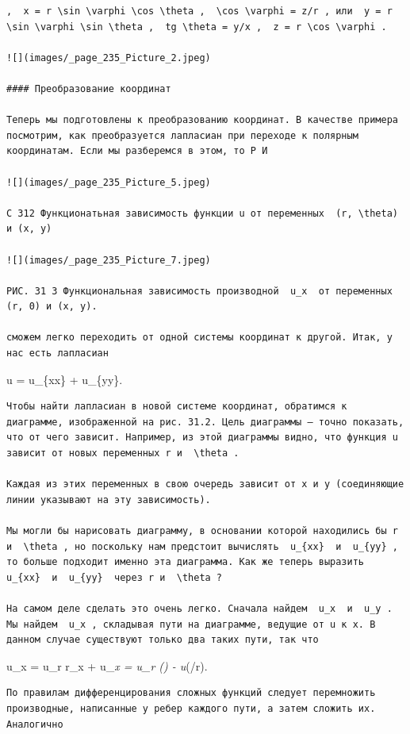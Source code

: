 \documentclass[
  ukrainian,
]{article}
\begin{document}
\begin{verbatim}
,  x = r \sin \varphi \cos \theta ,  \cos \varphi = z/r , или  y = r \sin \varphi \sin \theta ,  tg \theta = y/x ,  z = r \cos \varphi .

![](images/_page_235_Picture_2.jpeg)

#### Преобразование координат

Теперь мы подготовлены к преобразованию координат. В качестве примера посмотрим, как преобразуется лапласиан при переходе к полярным координатам. Если мы разберемся в этом, то Р И

![](images/_page_235_Picture_5.jpeg)

С 312 Функционатьная зависимость функции u от переменных  (r, \theta)  и (x, y)

![](images/_page_235_Picture_7.jpeg)

РИС. 31 3 Функциональная зависимость производной  u_x  от переменных (r, 0) и (x, y).

сможем легко переходить от одной системы координат к другой. Итак, у нас есть лапласиан
\end{verbatim}

\Delta u = u\_\{xx\} + u\_\{yy\}.

\begin{verbatim}
Чтобы найти лапласиан в новой системе координат, обратимся к диаграмме, изображенной на рис. 31.2. Цель диаграммы — точно показать, что от чего зависит. Например, из этой диаграммы видно, что функция u зависит от новых переменных r и  \theta .

Каждая из этих переменных в свою очередь зависит от x и y (соединяющие линии указывают на эту зависимость).

Мы могли бы нарисовать диаграмму, в основании которой находились бы r и  \theta , но поскольку нам предстоит вычислять  u_{xx}  и  u_{yy} , то больше подходит именно эта диаграмма. Как же теперь выразить  u_{xx}  и  u_{yy}  через r и  \theta ?

На самом деле сделать это очень легко. Сначала найдем  u_x  и  u_y . Мы найдем  u_x , складывая пути на диаграмме, ведущие от u к x. В данном случае существуют только два таких пути, так что
\end{verbatim}

u\_x = u\_r r\_x + u\_\theta \theta\emph{x = u\_r (\cos \theta) -
u}\theta (\sin \theta/r).

\begin{verbatim}
По правилам дифференцирования сложных функций следует перемножить производные, написанные у ребер каждого пути, а затем сложить их. Аналогично
\end{verbatim}
\end{document}
